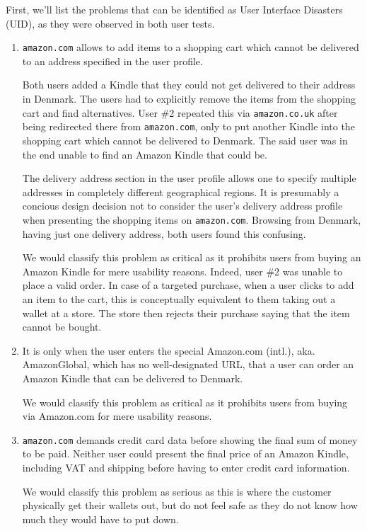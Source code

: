 First, we'll list the problems that can be identified as User Interface
Disasters (UID), as they were observed in both user tests.

\begin{enumerate}

\item \texttt{amazon.com} allows to add items to a shopping cart which cannot
be delivered to an address specified in the user profile.

Both users added a Kindle that they could not get delivered to their address in
Denmark. The users had to explicitly remove the items from the shopping cart
and find alternatives. User \#2 repeated this via \texttt{amazon.co.uk} after
being redirected there from \texttt{amazon.com}, only to put another Kindle
into the shopping cart which cannot be delivered to Denmark. The said user was
in the end unable to find an Amazon Kindle that could be.

The delivery address section in the user profile allows one to specify multiple
addresses in completely different geographical regions. It is presumably a
concious design decision not to consider the user's delivery address profile
when presenting the shopping items on \texttt{amazon.com}. Browsing from
Denmark, having just one delivery address, both users found this confusing.

We would classify this problem as critical as it prohibits users from buying an
Amazon Kindle for mere usability reasons.  Indeed, user \#2 was unable to place
a valid order. In case of a targeted purchase, when a user clicks to add an
item to the cart, this is conceptually equivalent to them taking out a wallet
at a store. The store then rejects their purchase saying that the item cannot
be bought.

\item It is only when the user enters the special Amazon.com (intl.), aka.
AmazonGlobal, which has no well-designated URL, that a user can order an Amazon
Kindle that can be delivered to Denmark.

We would classify this problem as critical as it prohibits users from buying
via Amazon.com for mere usability reasons.

\item \texttt{amazon.com} demands credit card data before showing the final sum
of money to be paid. Neither user could present the final price of an Amazon
Kindle, including VAT and shipping before having to enter credit card
information.

We would classify this problem as serious as this is where the customer
physically get their wallets out, but do not feel safe as they do not know how
much they would have to put down.

\end{enumerate}

